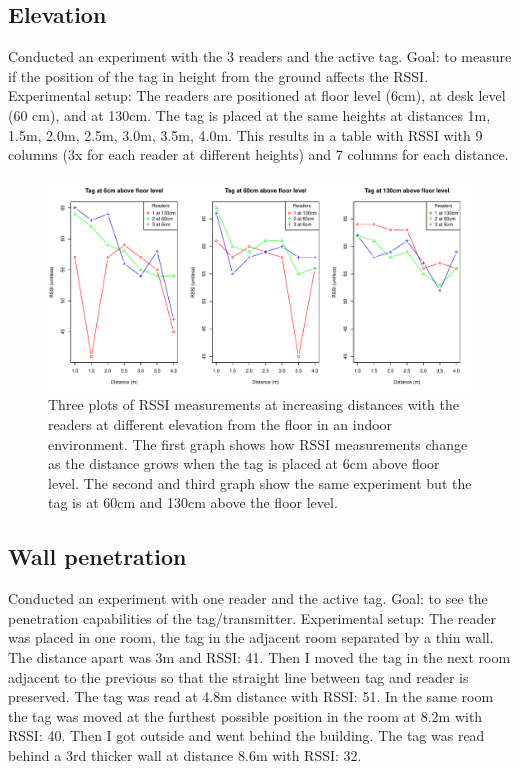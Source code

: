 \subsection{Elevation}

Conducted an experiment with the 3 readers and the active tag. Goal: to measure if the position of the tag in height from the ground affects the RSSI. Experimental setup: The readers are positioned at floor level (6cm), at desk level (60 cm), and at 130cm. The tag is placed at the same heights at distances 1m, 1.5m, 2.0m, 2.5m, 3.0m, 3.5m, 4.0m. This results in a table with RSSI with 9 columns (3x for each reader at different heights) and 7 columns for each distance.

\begin{figure}[H]
	\begin{center}
		\includegraphics[width=1\textwidth]{figures/rssi_distance_4m}
		\caption{Three plots of RSSI measurements at increasing distances with the readers at different elevation from the floor in an indoor environment. The first graph shows how RSSI measurements change as the distance grows when the tag is placed at 6cm above floor level. The second and third graph show the same experiment but the tag is at 60cm and 130cm above the floor level.}
	\end{center}
\end{figure}


\subsection{Wall penetration}

Conducted an experiment with one reader and the active tag. Goal: to see the penetration capabilities of the tag/transmitter. Experimental setup: The reader was placed in one room, the tag in the adjacent room separated by a thin wall. The distance apart was 3m and RSSI: 41. Then I moved the tag in the next room adjacent to the previous so that the straight line between tag and reader is preserved. The tag was read at 4.8m distance with RSSI: 51. In the same room the tag was moved at the furthest possible position in the room at 8.2m with RSSI: 40. Then I got outside and went behind the building. The tag was read behind a 3rd thicker wall at distance 8.6m with RSSI: 32.

